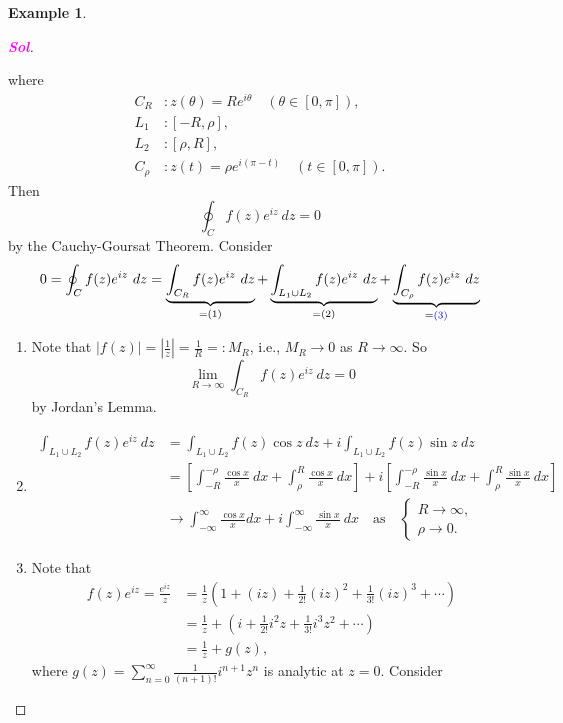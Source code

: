 \documentclass[12pt,openany]{book}
\theoremstyle{definition}
\newtheorem{example}{Example}[section]
\newcommand{\of}[1]{\left( #1 \right)}
\newcommand{\abs}[1]{\left\lvert #1 \right\rvert}
\newcommand{\sol}{\textcolor{magenta}{\bf Sol}}
\newcommand{\ie}{\textnormal{i.e.}}
\begin{document}
\begin{example}
\begin{proof}[\sol]
\begin{center}
			\end{center} where \begin{align*}
			C_R&: z(\theta)=Re^{i\theta}\quad(\theta\in[0,\pi]),\\
			L_1&: [-R,\rho],\\
			L_2&: [\rho,R],\\
			C_\rho&: z(t)=\rho e^{i(\pi-t)}\quad(t\in[0,\pi]).
		\end{align*} Then \[
		\oint_C f(z)e^{iz}\ dz=0
		\] by the Cauchy-Goursat Theorem. Consider \[
		0=\oint_C f(z)e^{iz}\ dz=\underbrace{\int_{C_R}f(z)e^{iz}\ dz}_{=(1)}+\underbrace{\int_{L_1\cup L_2}f(z)e^{iz}\ dz}_{=(2)}+\underbrace{\int_{C_\rho}f(z)e^{iz}\ dz}_{=\textcolor{blue}{(3)}}
		\] \begin{enumerate}[(1)]
				\item Note that $\abs{f(z)}=\abs{\frac{1}{z}}=\frac{1}{R}=:M_R$, \ie, $M_R\to 0$ as $R\to\infty$. So \[
				\lim\limits_{R\to\infty}\int_{C_R}f(z)e^{iz}\ dz=0
				\] by Jordan's Lemma.
				\item \begin{align*}
					\int_{L_1\cup L_2}f(z)e^{iz}\ dz&=\int_{L_1\cup L_2}f(z)\cos z\ dz+i\int_{L_1\cup L_2}f(z)\sin z\ dz\\
					&=\left[\int_{-R}^{-\rho}\frac{\cos x}{x}\ dx+\int_{\rho}^{R}\frac{\cos x}{x}\ dx\right]+i\left[\int_{-R}^{-\rho}\frac{\sin x}{x}\ dx+\int_{\rho}^{R}\frac{\sin x}{x}\ dx\right]\\
					&\to \int_{-\infty}^{\infty}\frac{\cos x}{x}dx + i\int_{-\infty}^{\infty}\frac{\sin x}{x}\ dx\quad\text{as}\quad\begin{cases}
						R\to\infty,\\
						\rho\to 0.
					\end{cases}
				\end{align*}
				\item Note that \begin{align*}
					f(z)e^{iz}=\frac{e^{iz}}{z}&=\frac{1}{z}\of{1+(iz)+\frac{1}{2!}(iz)^2+\frac{1}{3!}(iz)^3+\cdots}\\
					&=\frac{1}{z}+\of{i+\frac{1}{2!}i^2z+\frac{1}{3!}i^3z^2+\cdots}\\
					&=\frac{1}{z}+g(z),
				\end{align*} where $\displaystyle g(z)=\sum_{n=0}^\infty \frac{1}{(n+1)!}i^{n+1}z^n$ is analytic at $z=0$. Consider \[
\]
\end{enumerate}
\end{proof}
\end{example}
\end{document}
